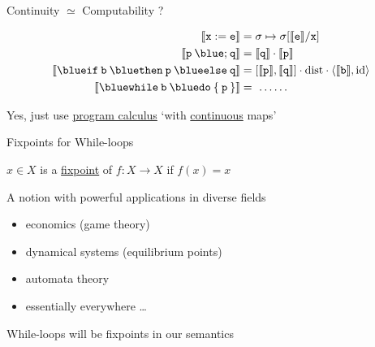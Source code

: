 \documentclass{beamer}
\begin{document}
\begin{frame}{Continuity $\simeq$ Computability ?} 

        \begin{align*}
                \sem{\prog{x : = e}} & = \sigma \mapsto \sigma[\sem{\prog{e}}/\prog{x}] \\
                \sem{\prog{p} \> {\blue ;} \> \prog{q}} & 
                = \sem{\prog{q}} \comp \sem{\prog{p}} \\
                \sem{\mathtt{{\blue if} \> b \> {\blue then} \> p \> {\blue else} \> q}}
                                                        & 
                                                        = [\sem{\prog{p}},\sem{\prog{q}}] \comp
                                                        \mathrm{dist} \comp \pv{\sem{\prog{b}}}{\id}
                \\
                \sem{\mathtt{{\blue while} \> b \> {\blue do} \> \{ \> p \> \}} }
                                                        & =\  \dots \dots
        \end{align*}

        \vfill
        \begin{center}
        \end{center}
        \pause
        \begin{center}
        Yes, just use \alert{\underline{program calculus}} `with
        \alert{\underline{continuous}} maps'
        \end{center}
\end{frame}

\begin{frame}{Fixpoints for While-loops}

        \begin{definition}
                $x \in X$ is a \alert{\underline{fixpoint}} of $f :
                X \to X$ if $f(x) = x$
        \end{definition}

        A notion with powerful applications in diverse fields
        \begin{itemize}
                \item economics (game theory)
                \item dynamical systems (equilibrium points)
                \item automata theory
                \item essentially everywhere \dots
        \end{itemize}

        \pause
        \bigskip
        While-loops will be fixpoints in our semantics
\end{frame}
\end{document}
